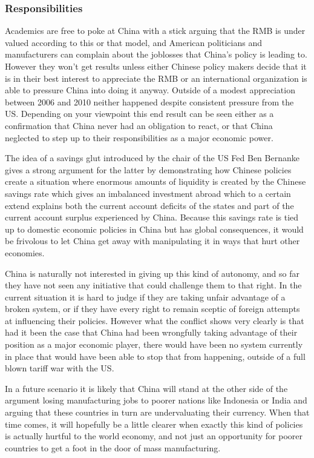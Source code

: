 \subsubsection{Responsibilities}

Academics are free to poke at China with a stick arguing that the RMB is 
under valued according to this or that model, and American politicians 
and manufacturers can complain about the joblosses that China's policy 
is leading to. However they won't get results unless either Chinese 
policy makers decide that it is in their best interest to appreciate the 
RMB or an international organization is able to pressure China into 
doing it anyway. Outside of a modest appreciation between 2006 and 2010 
neither happened despite consistent pressure from the US. Depending on 
your viewpoint this end result can be seen either as a confirmation that 
China never had an obligation to react, or that China neglected to step 
up to their responsibilities as a major economic power.

The idea of a savings glut introduced by the chair of the US Fed Ben 
Bernanke gives a strong argument for the latter by demonstrating how 
Chinese policies create a situation where enormous amounts of liquidity 
is created by the Chinese savings rate which gives an imbalanced 
investment abroad which to a certain extend explains both the current 
account deficits of the states and part of the current account surplus 
experienced by China. Because this savings rate is tied up to domestic 
economic policies in China but has global consequences, it would be 
frivolous to let China get away with manipulating it in ways that hurt 
other economies.

China is naturally not interested in giving up this kind of autonomy, 
and so far they have not seen any initiative that could challenge them 
to that right. In the current situation it is hard to judge if they are 
taking unfair advantage of a broken system, or if they have every right 
to remain sceptic of foreign attempts at influencing their policies.  
However what the conflict shows very clearly is that had it been the 
case that China had been wrongfully taking advantage of their position 
as a major economic player, there would have been no system currently in 
place that would have been able to stop that from happening, outside of 
a full blown tariff war with the US.

In a future scenario it is likely that China will stand at the other 
side of the argument losing manufacturing jobs to poorer nations like 
Indonesia or India and arguing that these countries in turn are 
undervaluating their currency. When that time comes, it will hopefully 
be a little clearer when exactly this kind of policies is actually 
hurtful to the world economy, and not just an opportunity for poorer 
countries to get a foot in the door of mass manufacturing.


